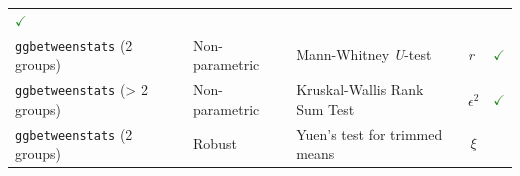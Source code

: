 \documentclass[]{article}
\begin{document}
\begin{longtable}[]{@{}lllll@{}}
\begin{minipage}[t]{0.07\columnwidth}
\textcolor{ForestGreen}{$\checkmark$}\strut
\end{minipage}\tabularnewline
\begin{minipage}[t]{0.20\columnwidth}\raggedright
\texttt{ggbetweenstats} (2 groups)\strut
\end{minipage} & \begin{minipage}[t]{0.16\columnwidth}\raggedright
Non-parametric\strut
\end{minipage} & \begin{minipage}[t]{0.31\columnwidth}\raggedright
Mann-Whitney \emph{U}-test\strut
\end{minipage} & \begin{minipage}[t]{0.12\columnwidth}\raggedright
\emph{r}\strut
\end{minipage} & \begin{minipage}[t]{0.07\columnwidth}\raggedright
\textcolor{ForestGreen}{$\checkmark$}\strut
\end{minipage}\tabularnewline
\begin{minipage}[t]{0.20\columnwidth}\raggedright
\texttt{ggbetweenstats} (\textgreater{} 2 groups)\strut
\end{minipage} & \begin{minipage}[t]{0.16\columnwidth}\raggedright
Non-parametric\strut
\end{minipage} & \begin{minipage}[t]{0.31\columnwidth}\raggedright
Kruskal-Wallis Rank Sum Test\strut
\end{minipage} & \begin{minipage}[t]{0.12\columnwidth}\raggedright
\[\epsilon^2\]\strut
\end{minipage} & \begin{minipage}[t]{0.07\columnwidth}\raggedright
\textcolor{ForestGreen}{$\checkmark$}\strut
\end{minipage}\tabularnewline
\begin{minipage}[t]{0.20\columnwidth}\raggedright
\texttt{ggbetweenstats} (2 groups)\strut
\end{minipage} & \begin{minipage}[t]{0.16\columnwidth}\raggedright
Robust\strut
\end{minipage} & \begin{minipage}[t]{0.31\columnwidth}\raggedright
Yuen's test for trimmed means\strut
\end{minipage} & \begin{minipage}[t]{0.12\columnwidth}\raggedright
\[\xi\]\strut
\end{minipage} & \begin{minipage}[t]{0.07\columnwidth}\raggedright

\end{minipage}
\end{longtable}
\end{document}
